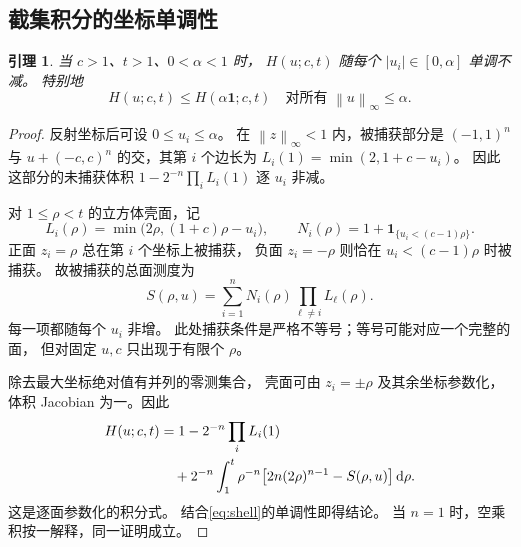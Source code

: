 \documentclass[UTF8,a4paper,11pt,fontset=fandol]{ctexart}
\newtheorem{lemma}{引理}[section]
\theoremstyle{remark}
\newcommand{\one}{\mathbf 1}
\newcommand{\norm}[1]{\left\lVert#1\right\rVert}
\newcommand{\dint}{\,\mathrm d}
\begin{document}
\subsection{截集积分的坐标单调性}
\begin{lemma}\label{lem:corner}
当 $c>1$、$t>1$、$0<\alpha<1$ 时，
$H(u;c,t)$ 随每个 $|u_i|\in[0,\alpha]$ 单调不减。
特别地
\[
 H(u;c,t)\le H(\alpha\one;c,t)
 \quad\text{对所有 }\norm u_\infty\le\alpha.
\]
\end{lemma}
\begin{proof}
反射坐标后可设 $0\le u_i\le\alpha$。
在 $\norm z_\infty<1$ 内，被捕获部分是
$(-1,1)^n$ 与 $u+(-c,c)^n$ 的交，其第 $i$ 个边长为
$L_i(1)=\min(2,1+c-u_i)$。
因此这部分的未捕获体积
$1-2^{-n}\prod_iL_i(1)$ 逐 $u_i$ 非减。

对 $1\le\rho<t$ 的立方体壳面，记
\[
 L_i(\rho)=\min\bigl(2\rho,(1+c)\rho-u_i\bigr),\qquad
 N_i(\rho)=1+\one_{\{u_i<(c-1)\rho\}}.
\]
正面 $z_i=\rho$ 总在第 $i$ 个坐标上被捕获，
负面 $z_i=-\rho$ 则恰在 $u_i<(c-1)\rho$ 时被捕获。
故被捕获的总面测度为
\begin{equation}\label{eq:shell}
 S(\rho,u)=\sum_{i=1}^n
                 N_i(\rho)\prod_{\ell\ne i}L_\ell(\rho).
\end{equation}
每一项都随每个 $u_i$ 非增。
此处捕获条件是严格不等号；等号可能对应一个完整的面，
但对固定 $u,c$ 只出现于有限个 $\rho$。

除去最大坐标绝对值有并列的零测集合，
壳面可由 $z_i=\pm\rho$ 及其余坐标参数化，
体积 Jacobian 为一。因此
\begin{align}\label{eq:H-shell}
 H(u;c,t)
 &=1-2^{-n}\prod_iL_i(1)\\
 &\quad+2^{-n}\int_1^t\rho^{-n}
       \bigl[2n(2\rho)^{n-1}-S(\rho,u)\bigr]\dint\rho.\notag
\end{align}
这是逐面参数化的积分式。
结合\eqref{eq:shell}的单调性即得结论。
当 $n=1$ 时，空乘积按一解释，同一证明成立。
\end{proof}
\end{document}
